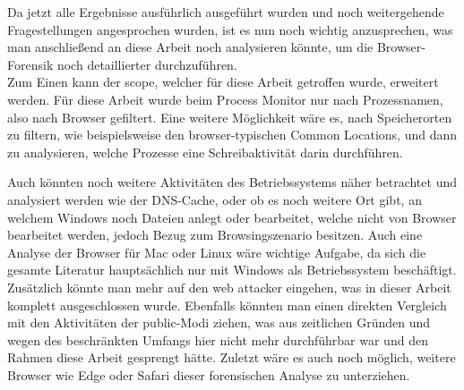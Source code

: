 
Da jetzt alle Ergebnisse ausführlich ausgeführt wurden und noch weitergehende Fragestellungen angesprochen wurden, ist es nun noch wichtig anzusprechen, was man anschließend an diese Arbeit noch analysieren könnte, um die Browser-Forensik noch detaillierter durchzuführen.\\
Zum Einen kann der scope, welcher für diese Arbeit getroffen wurde, erweitert werden. Für diese Arbeit wurde beim Process Monitor nur nach Prozessnamen, also nach Browser gefiltert. Eine weitere Möglichkeit wäre es, nach Speicherorten zu filtern, wie beispielsweise den browser-typischen Common Locations, und dann zu analysieren, welche Prozesse eine Schreibaktivität darin durchführen. 

Auch könnten noch weitere Aktivitäten des Betriebssystems näher betrachtet und analysiert werden wie der DNS-Cache, oder ob es noch weitere Ort gibt, an welchem Windows noch Dateien anlegt oder bearbeitet, welche nicht von Browser bearbeitet werden, jedoch Bezug zum Browsingszenario besitzen. Auch eine Analyse der Browser für Mac oder Linux wäre wichtige Aufgabe, da sich die gesamte Literatur hauptsächlich nur mit Windows als Betriebssystem beschäftigt. Zusätzlich könnte man mehr auf den web attacker eingehen, was in dieser Arbeit komplett ausgeschlossen wurde. Ebenfalls könnten man einen direkten Vergleich mit den Aktivitäten der public-Modi ziehen, was aus zeitlichen Gründen und wegen des beschränkten Umfangs hier nicht mehr durchführbar war und den Rahmen diese Arbeit gesprengt hätte. Zuletzt wäre es auch noch möglich, weitere Browser wie Edge oder Safari dieser forensischen Analyse zu unterziehen.

\begin{comment}
	Struktur:
	
	
	
	
	
\end{comment}